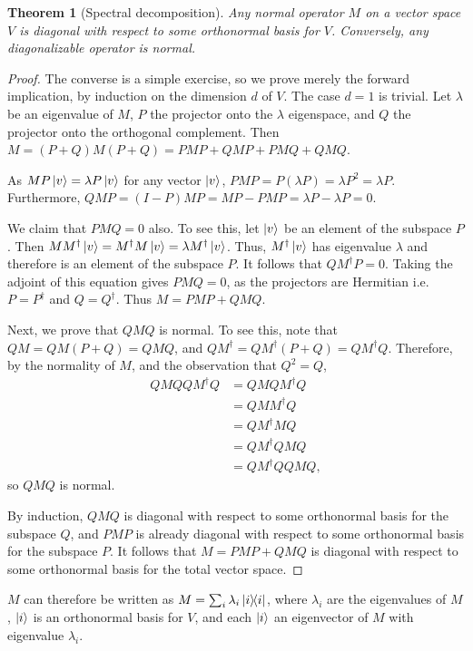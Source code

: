 \documentclass{article}
\newtheorem{theorem}{Theorem}
\numberwithin{theorem}{section}
\numberwithin{corollary}{section}
\begin{document}
\begin{theorem}[Spectral decomposition]
  Any normal operator $M$ on a vector space $V$ is diagonal with respect to
  some orthonormal basis for $V$. Conversely, any diagonalizable operator is
  normal.
\end{theorem}
\begin{proof}
  The converse is a simple exercise, so we prove merely the forward
  implication, by induction on the dimension $d$ of $V$. The case $d = 1$ is
  trivial. Let $\lambda$ be an eigenvalue of $M$, $P$ the projector onto the
  $\lambda$ eigenspace, and $Q$ the projector onto the orthogonal complement.
  Then $M = (P + Q)M(P + Q) = PMP + QMP + PMQ + QMQ$.

  As $MP\ket{v} = \lambda P \ket{v}$ for any vector $\ket{v}$, $PMP = P(\lambda
  P) = \lambda P^2 = \lambda P$. Furthermore, $QMP = (I - P)MP = MP - PMP =
  \lambda P - \lambda P = 0$.

  We claim that $PMQ = 0$ also. To see this, let $\ket{v}$ be an element of the
  subspace $P$. Then $M M^\dagger \ket{v} = M^\dagger M \ket{v} = \lambda
  M^\dagger \ket{v}$. Thus, $M^\dagger \ket{v}$ has eigenvalue $\lambda$ and
  therefore is an element of the subspace $P$. It follows that $Q M^\dagger P =
  0$. Taking the adjoint of this equation gives $PMQ = 0$, as the projectors
  are Hermitian i.e. $P = P^\dagger$ and $Q = Q^\dagger$. Thus $M = PMP + QMQ$.

  Next, we prove that $QMQ$ is normal. To see this, note that $QM = QM(P + Q) =
  QMQ$, and $Q M^\dagger = Q M^\dagger (P+Q) = Q M^\dagger Q$. Therefore, by
  the normality of $M$, and the observation that $Q^2 = Q$, \begin{align*}
    Q M Q Q M^\dagger Q
    &= Q M Q M^\dagger Q \\
    &= Q M M^\dagger Q \\
    &= Q M^\dagger M Q \\
    &= Q M^\dagger Q M Q \\
    &= Q M^\dagger Q Q M Q,
  \end{align*} so $QMQ$ is normal.

  By induction, $QMQ$ is diagonal with respect to some orthonormal basis for
  the subspace $Q$, and $PMP$ is already diagonal with respect to some
  orthonormal basis for the subspace $P$. It follows that $M = PMP + QMQ$ is
  diagonal with respect to some orthonormal basis for the total vector space.
\end{proof}

$M$ can therefore be written as $M = \sum_i \lambda_i\op{i}{i}$, where
$\lambda_i$ are the eigenvalues of $M$, $\ket{i}$ is an orthonormal basis for
$V$, and each $\ket{i}$ an eigenvector of $M$ with eigenvalue $\lambda_i$.
\end{document}
